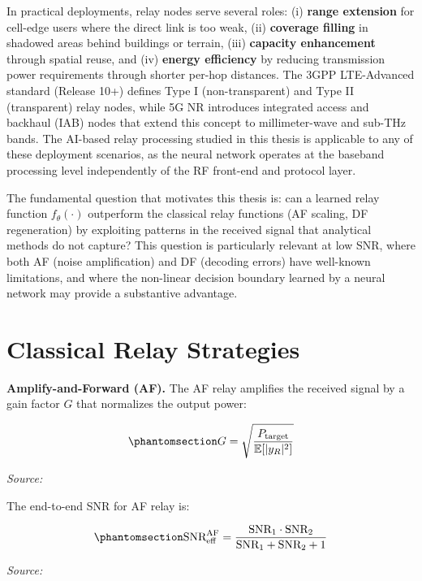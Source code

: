 In practical deployments, relay nodes serve several roles: (i) \textbf{range extension} for cell-edge users where the direct link is too weak, (ii) \textbf{coverage filling} in shadowed areas behind buildings or terrain, (iii) \textbf{capacity enhancement} through spatial reuse, and (iv) \textbf{energy efficiency} by reducing transmission power requirements through shorter per-hop distances. The 3GPP LTE-Advanced standard (Release 10+) defines Type I (non-transparent) and Type II (transparent) relay nodes, while 5G NR introduces integrated access and backhaul (IAB) nodes that extend this concept to millimeter-wave and sub-THz bands. The AI-based relay processing studied in this thesis is applicable to any of these deployment scenarios, as the neural network operates at the baseband processing level independently of the RF front-end and protocol layer.

The fundamental question that motivates this thesis is: can a learned relay function \(f_\theta(\cdot)\) outperform the classical relay functions (AF scaling, DF regeneration) by exploiting patterns in the received signal that analytical methods do not capture? This question is particularly relevant at low SNR, where both AF (noise amplification) and DF (decoding errors) have well-known limitations, and where the non-linear decision boundary learned by a neural network may provide a substantive advantage.

\section{Classical Relay Strategies}\label{sec:classical-relay-strategies}

\textbf{Amplify-and-Forward (AF).} The AF relay amplifies the received signal by a gain factor \(G\) that normalizes the output power:

\begin{equation}\protect\phantomsection\label{eq:af-gain}{G = \sqrt{\frac{P_{\text{target}}}{\mathbb{E}[|y_R|^2]}}
}\end{equation} \par{\small\textit{Source: \cite{laneman2004cooperative}}}

The end-to-end SNR for AF relay is:

\begin{equation}\protect\phantomsection\label{eq:af-snr}{\text{SNR}_{\text{eff}}^{\text{AF}} = \frac{\text{SNR}_1 \cdot \text{SNR}_2}{\text{SNR}_1 + \text{SNR}_2 + 1}
}\end{equation} \par{\small\textit{Source: \cite{laneman2004cooperative}}}

